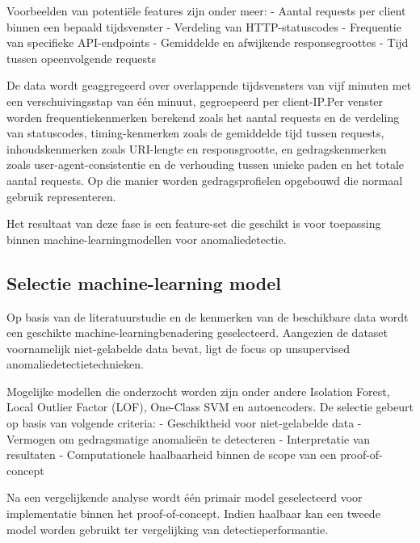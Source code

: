 Voorbeelden van potentiële features zijn onder meer:
- Aantal requests per client binnen een bepaald tijdsvenster  
- Verdeling van HTTP-statuscodes  
- Frequentie van specifieke API-endpoints  
- Gemiddelde en afwijkende responsegroottes  
- Tijd tussen opeenvolgende requests  

De data wordt geaggregeerd over overlappende tijdsvensters van vijf minuten met een verschuivingsstap van één minuut, gegroepeerd per client-IP.Per venster worden frequentiekenmerken berekend zoals het aantal requests en de verdeling van statuscodes, timing-kenmerken zoals de gemiddelde tijd tussen requests, inhoudskenmerken zoals URI-lengte en responsgrootte, en gedragskenmerken zoals user-agent-consistentie en de verhouding tussen unieke paden en het totale aantal requests. Op die manier worden gedragsprofielen opgebouwd die normaal gebruik representeren. 

Het resultaat van deze fase is een feature-set die geschikt is voor toepassing binnen machine-learningmodellen voor anomaliedetectie.


\subsection{Selectie machine-learning model}
\label{subsec:traditioneel-beperkingen}

Op basis van de literatuurstudie en de kenmerken van de beschikbare data wordt een geschikte machine-learningbenadering geselecteerd. Aangezien de dataset voornamelijk niet-gelabelde data bevat, ligt de focus op unsupervised anomaliedetectietechnieken.

Mogelijke modellen die onderzocht worden zijn onder andere Isolation Forest, Local Outlier Factor (LOF), One-Class SVM en autoencoders. De selectie gebeurt op basis van volgende criteria:
- Geschiktheid voor niet-gelabelde data  
- Vermogen om gedragsmatige anomalieën te detecteren  
- Interpretatie van resultaten  
- Computationele haalbaarheid binnen de scope van een proof-of-concept  

Na een vergelijkende analyse wordt één primair model geselecteerd voor implementatie binnen het proof-of-concept. Indien haalbaar kan een tweede model worden gebruikt ter vergelijking van detectieperformantie.


